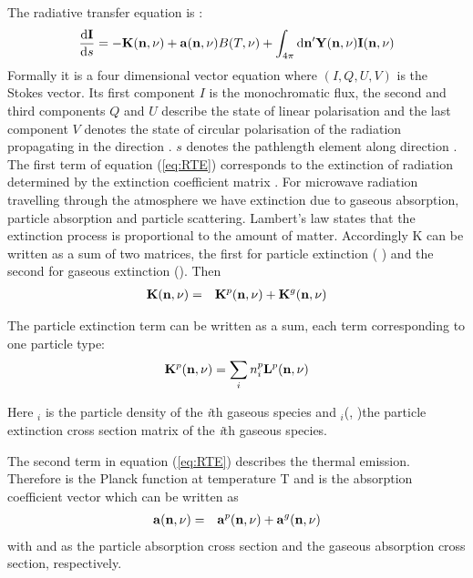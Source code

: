 \newcommand{\DirFre} {(\PDir, \Frq)}



\label{sec:scattering:general_rte}
 

The radiative transfer equation is \citep{mishchenko00:_light_scatt_nonsp_partic}: 
\begin{eqnarray}
     \frac{\DiffD \StoVec}{\DiffD s} =
     -\ExtMat\DirFre+\AbsVec\DirFre \Planck(\Tmp, \Frq)
     +\int_{4\pi} \DiffD \PDir' \SEfMat\DirFre \StoVec\DirFre 
     \label{eq:RTE} 
\end{eqnarray} 
Formally it is a four dimensional vector equation where \StoVec
$(I,Q,U,V)$ is the Stokes vector.
Its first component $I$ is the monochromatic flux, the
second and third components $Q$ and $U$ describe the state of linear
polarisation and the last component $V$ denotes the state of circular
polarisation of the radiation propagating in the direction \PDir.
\DiffD $s$ denotes the pathlength element along direction \PDir.
\\

The first term of equation (\ref{eq:RTE}) corresponds to the extinction of
radiation determined by the extinction coefficient matrix \ExtMat
. For microwave radiation travelling through the atmosphere we
have extinction due to gaseous
absorption, particle absorption and  particle scattering. Lambert's law
states that the extinction process is
proportional to the amount of matter. Accordingly K can be written as
a sum of two matrices, the first for particle extinction ( )
and the second for gaseous extinction (). Then
\begin{eqnarray}
  \ExtMat\DirFre &=&
  \aExtMat{p}\DirFre+\aExtMat{g}\DirFre
\end{eqnarray}

The particle extinction term can be written as a sum, each term
corresponding to one particle type:
\begin{eqnarray}
  \aExtMat{p}\DirFre = \sum_i \PDen_i \aSExMat{p} \DirFre
\end{eqnarray}

Here \PDen$_i$ is the particle density of the
{\sl i}th gaseous species and  $_i$\DirFre  the particle
extinction cross section matrix of the
{\sl i}th gaseous species.

The second term in equation (\ref{eq:RTE})  describes the thermal
emission. Therefore \Planck  is the Planck
function at temperature T and \AbsVec  is the absorption
coefficient vector which can be written as
 \begin{eqnarray}
  \AbsVec \DirFre  &=& \aAbsVec{p} \DirFre + \aAbsVec{g} \DirFre 
  \end{eqnarray}
with  and  as the particle
absorption 
cross section
and the gaseous absorption cross section, respectively. 

